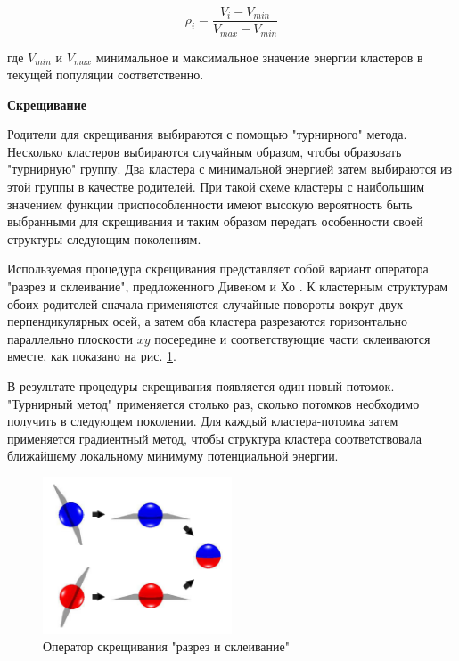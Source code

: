 \begin{equation}
  \rho_{i} = \frac{V_{i} - V_{min}}{V_{max}-V_{min}}
\end{equation}

где $V_{min}$ и $V_{max}$ минимальное и максимальное значение энергии кластеров в
текущей популяции соответственно.

{\bf Скрещивание}

Родители для скрещивания выбираются с помощью "турнирного" метода. Несколько кластеров
выбираются случайным образом, чтобы образовать "турнирную" группу. Два кластера с минимальной
энергией затем выбираются из этой группы в качестве родителей. При такой схеме кластеры
с наибольшим значением функции приспособленности имеют высокую вероятность быть выбранными
для скрещивания и таким образом передать особенности своей структуры следующим поколениям.

Используемая процедура скрещивания представляет собой вариант оператора "разрез и склеивание",
предложенного Дивеном и Хо \cite{deaven}. К кластерным структурам обоих родителей сначала
применяются случайные повороты вокруг двух перпендикулярных осей, а затем оба кластера разрезаются
горизонтально параллельно плоскости $xy$ посередине и соответствующие части склеиваются вместе,
как показано на рис. \ref{cut_and_splice}.

В результате процедуры скрещивания появляется один новый потомок. "Турнирный метод" применяется
столько раз, сколько потомков необходимо получить в следующем поколении.
Для каждый кластера-потомка затем применяется градиентный метод, чтобы структура кластера
соответствовала ближайшему локальному минимуму потенциальной энергии.

\begin{figure}[h!]
\centering
  \includegraphics[width=0.5\textwidth]{./FIGs/cut_and_splice.png}
\caption{Оператор скрещивания "разрез и склеивание"}
\label{cut_and_splice}
\end{figure}

